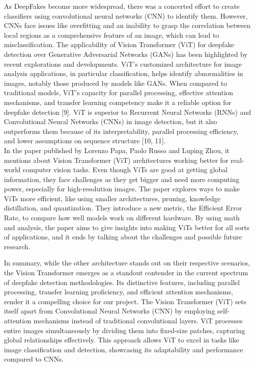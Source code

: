 As DeepFakes become more widespread, there was a concerted effort to create classifiers using convolutional neural networks (CNN) to identify them. However, CNNs face issues like overfitting and an inability to grasp the correlation between local regions as a comprehensive feature of an image, which can lead to misclassification. The applicability of Vision Transformer (ViT) for deepfake detection over Generative Adversarial Networks (GANs) has been highlighted by recent explorations and developments. ViT's customized architecture for image analysis applications, in particular classification, helps identify abnormalities in images, notably those produced by models like GANs. When compared to traditional models, ViT's capacity for parallel processing, effective attention mechanisms, and transfer learning competency make it a reliable option for deepfake detection [9]. ViT is superior to Recurrent Neural Networks (RNNs) and Convolutional Neural Networks (CNNs) in image detection, but it also outperforms them because of its interpretability, parallel processing efficiency, and lower assumptions on sequence structure [10, 11].\\

In the paper published by Lorenzo Papa, Paolo Russo and Luping Zhou, it mentions about Vision Transformer (ViT) architectures working better for real-world computer vision tasks. Even though ViTs are good at getting global information, they face challenges as they get bigger and need more computing power, especially for high-resolution images. The paper explores ways to make ViTs more efficient, like using smaller architectures, pruning, knowledge distillation, and quantization. They introduce a new metric, the Efficient Error Rate, to compare how well models work on different hardware. By using math and analysis, the paper aims to give insights into making ViTs better for all sorts of applications, and it ends by talking about the challenges and possible future research.

In summary, while the other architecture stands out on their respective scenarios, the Vision Transformer emerges as a standout contender in the current spectrum of deepfake detection methodologies. Its distinctive features, including parallel processing, transfer learning proficiency, and efficient attention mechanisms, render it a compelling choice for our project. The Vision Transformer (ViT) sets itself apart from Convolutional Neural Networks (CNN) by employing self-attention mechanisms instead of traditional convolutional layers. ViT processes entire images simultaneously by dividing them into fixed-size patches, capturing global relationships effectively. This approach allows ViT to excel in tasks like image classification and detection, showcasing its adaptability and performance compared to CNNs.
